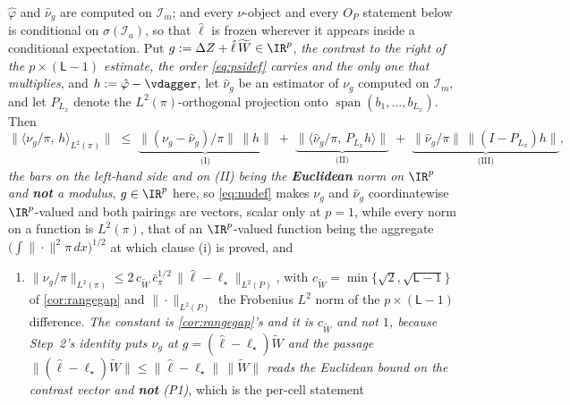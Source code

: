 \begin{lemma}
$\hat\varphi$ and $\hat\nu_g$ are computed on $\mathcal I_m$; and every $\nu$-object and every
$O_P$ statement below is conditional on $\sigma(\mathcal I_a)$, so that $\hat\ell$ is frozen wherever it
appears inside a conditional expectation. Put $g:=\Delta Z+\hat\ell\,\widetilde W\in\IR^{p}$, 
\emph{the contrast to the right of the $p\times(\mathsf L-1)$ estimate, the order \eqref{eq:psidef}
carries and the only one that multiplies}, and
$h:=\hat\varphi-\vdagger$, let $\hat\nu_g$ be an estimator of $\nu_g$ computed on $\mathcal I_m$, and let
$P_{L_x}$ denote the $L^{2}(\pi)$-orthogonal projection onto
$\operatorname{span}(b_1,\dots,b_{L_x})$. Then
\begin{equation}\label{eq:balance3}
\big\|\langle\nu_g/\pi,\,h\rangle_{L^{2}(\pi)}\big\|
\;\le\;\underbrace{\big\|(\nu_g-\hat\nu_g)/\pi\big\|\,\|h\|}_{\text{(I)}}
\;+\;\underbrace{\big\|\langle\hat\nu_g/\pi,\,P_{L_x}h\rangle\big\|}_{\text{(II)}}
\;+\;\underbrace{\big\|\hat\nu_g/\pi\big\|\,\big\|(I-P_{L_x})h\big\|}_{\text{(III)}},
\end{equation}
\emph{the bars on the left-hand side and on \textup{(II)} being the \textbf{Euclidean} norm on $\IR^{p}$
and \textbf{not} a modulus}, $g\in\IR^{p}$ here, so \eqref{eq:nudef} makes $\nu_g$ and $\hat\nu_g$
coordinatewise $\IR^{p}$-valued and both pairings are vectors, scalar only at $p=1$, while every norm
on a function is $L^{2}(\pi)$, that of an $\IR^{p}$-valued function being the aggregate
$\big(\int\|\cdot\|^{2}\pi\,dx\big)^{1/2}$ at which clause \textup{(i)} is proved, and
\begin{enumerate}
\item[(i)] $\|\nu_g/\pi\|_{L^{2}(\pi)}\le2\,c_{\widetilde W}\,\bar c_\pi^{1/2}\,\|\hat\ell-\ell_\star\|_{L^{2}(P)}$,
with $c_{\widetilde W}=\min\{\sqrt2,\sqrt{\mathsf L-1}\}$ of \cref{cor:rangegap} and
$\|\cdot\|_{L^{2}(P)}$ the Frobenius $L^{2}$ norm of the $p\times(\mathsf L-1)$ difference.
\emph{The constant is \cref{cor:rangegap}'s and it is $c_{\widetilde W}$ and not $1$, because
Step~2's identity puts $\nu_g$ at $g=(\hat\ell-\ell_\star)\widetilde W$ and the passage
$\|(\hat\ell-\ell_\star)\widetilde W\|\le\|\hat\ell-\ell_\star\|\,\|\widetilde W\|$ reads the Euclidean
bound on the contrast vector and \textbf{not} \textup{(P1)}}, which is the per-cell statement

\end{enumerate}
\end{lemma}
